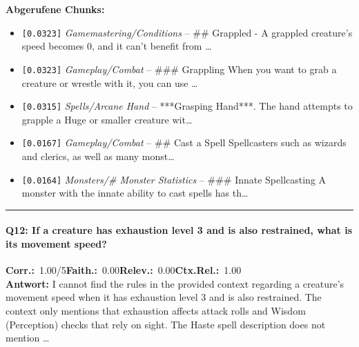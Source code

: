 \noindent\textbf{Abgerufene Chunks:}
\begin{itemize}[noitemsep, topsep=2pt]
  \item[\textbf{\#1}] \texttt{[0.0323]} \textit{Gamemastering/Conditions} -- \#\# Grappled  - A grappled creature's speed becomes 0, and it can't benefit from \ldots
  \item[\textbf{\#2}] \texttt{[0.0323]} \textit{Gameplay/Combat} -- \#\#\# Grappling  When you want to grab a creature or wrestle with it, you can use \ldots
  \item[\textbf{\#3}] \texttt{[0.0315]} \textit{Spells/Arcane Hand} -- ***Grasping Hand***. The hand attempts to grapple a Huge or smaller creature wit\ldots
  \item[\textbf{\#4}] \texttt{[0.0167]} \textit{Gameplay/Combat} -- \#\# Cast a Spell  Spellcasters such as wizards and clerics, as well as many monst\ldots
  \item[\textbf{\#5}] \texttt{[0.0164]} \textit{Monsters/# Monster Statistics} -- \#\#\# Innate Spellcasting  A monster with the innate ability to cast spells has th\ldots
\end{itemize}
\vspace{4pt}
\hrule
\vspace{6pt}

\paragraph{Q12: If a creature has exhaustion level 3 and is also restrained, what is its movement speed?}
\noindent \textbf{Corr.:}~1.00/5\quad \textbf{Faith.:}~0.00\quad \textbf{Relev.:}~0.00\quad \textbf{Ctx.Rel.:}~1.00\\

\noindent\textbf{Antwort:} I cannot find the rules in the provided context regarding a creature's movement speed when it has exhaustion level 3 and is also restrained. The context only mentions that exhaustion affects attack rolls and Wisdom (Perception) checks that rely on sight. The Haste spell description does not mention \ldots

